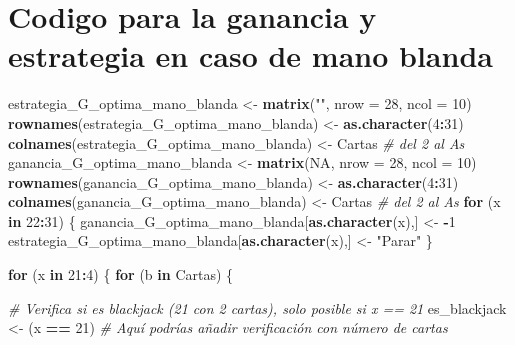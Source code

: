 \documentclass[12pt,a4paper,]{book}
\newenvironment{Shaded}{\begin{snugshade}}{\end{snugshade}}
\newcommand{\AttributeTok}[1]{\textcolor[rgb]{0.13,0.29,0.53}{#1}}
\newcommand{\CommentTok}[1]{\textcolor[rgb]{0.56,0.35,0.01}{\textit{#1}}}
\newcommand{\ConstantTok}[1]{\textcolor[rgb]{0.56,0.35,0.01}{#1}}
\newcommand{\ControlFlowTok}[1]{\textcolor[rgb]{0.13,0.29,0.53}{\textbf{#1}}}
\newcommand{\DecValTok}[1]{\textcolor[rgb]{0.00,0.00,0.81}{#1}}
\newcommand{\FunctionTok}[1]{\textcolor[rgb]{0.13,0.29,0.53}{\textbf{#1}}}
\newcommand{\NormalTok}[1]{#1}
\newcommand{\OtherTok}[1]{\textcolor[rgb]{0.56,0.35,0.01}{#1}}
\newcommand{\SpecialCharTok}[1]{\textcolor[rgb]{0.81,0.36,0.00}{\textbf{#1}}}
\newcommand{\StringTok}[1]{\textcolor[rgb]{0.31,0.60,0.02}{#1}}
\numberwithin{dummy}{section}
\theoremstyle{ocrenumbox}
\theoremstyle{blacknumex}
\theoremstyle{blacknumbox}
\theoremstyle{ocrenum}
\theoremstyle{ocrenum}
\begin{document}
\hypertarget{codigo-para-la-ganancia-y-estrategia-en-caso-de-mano-blanda}{%
\section{Codigo para la ganancia y estrategia en caso de mano
blanda}\label{codigo-para-la-ganancia-y-estrategia-en-caso-de-mano-blanda}}

\begin{Shaded}
\begin{Highlighting}[]
\NormalTok{estrategia\_G\_optima\_mano\_blanda }\OtherTok{\textless{}{-}} \FunctionTok{matrix}\NormalTok{(}\StringTok{""}\NormalTok{, }\AttributeTok{nrow =} \DecValTok{28}\NormalTok{, }\AttributeTok{ncol =} \DecValTok{10}\NormalTok{)}
\FunctionTok{rownames}\NormalTok{(estrategia\_G\_optima\_mano\_blanda) }\OtherTok{\textless{}{-}} \FunctionTok{as.character}\NormalTok{(}\DecValTok{4}\SpecialCharTok{:}\DecValTok{31}\NormalTok{)}
\FunctionTok{colnames}\NormalTok{(estrategia\_G\_optima\_mano\_blanda) }\OtherTok{\textless{}{-}}\NormalTok{ Cartas  }\CommentTok{\# del 2 al As}
\NormalTok{ganancia\_G\_optima\_mano\_blanda }\OtherTok{\textless{}{-}} \FunctionTok{matrix}\NormalTok{(}\ConstantTok{NA}\NormalTok{, }\AttributeTok{nrow =} \DecValTok{28}\NormalTok{, }\AttributeTok{ncol =} \DecValTok{10}\NormalTok{)}
\FunctionTok{rownames}\NormalTok{(ganancia\_G\_optima\_mano\_blanda) }\OtherTok{\textless{}{-}} \FunctionTok{as.character}\NormalTok{(}\DecValTok{4}\SpecialCharTok{:}\DecValTok{31}\NormalTok{)}
\FunctionTok{colnames}\NormalTok{(ganancia\_G\_optima\_mano\_blanda) }\OtherTok{\textless{}{-}}\NormalTok{ Cartas  }\CommentTok{\# del 2 al As}
\ControlFlowTok{for}\NormalTok{ (x }\ControlFlowTok{in} \DecValTok{22}\SpecialCharTok{:}\DecValTok{31}\NormalTok{) \{}
\NormalTok{  ganancia\_G\_optima\_mano\_blanda[}\FunctionTok{as.character}\NormalTok{(x),] }\OtherTok{\textless{}{-}} \SpecialCharTok{{-}}\DecValTok{1}
\NormalTok{  estrategia\_G\_optima\_mano\_blanda[}\FunctionTok{as.character}\NormalTok{(x),] }\OtherTok{\textless{}{-}} \StringTok{"Parar"}
\NormalTok{\}}

\ControlFlowTok{for}\NormalTok{ (x }\ControlFlowTok{in} \DecValTok{21}\SpecialCharTok{:}\DecValTok{4}\NormalTok{) \{}
  \ControlFlowTok{for}\NormalTok{ (b }\ControlFlowTok{in}\NormalTok{ Cartas) \{}
    
    \CommentTok{\# Verifica si es blackjack (21 con 2 cartas), solo posible si x == 21}
\NormalTok{    es\_blackjack }\OtherTok{\textless{}{-}}\NormalTok{ (x }\SpecialCharTok{==} \DecValTok{21}\NormalTok{)  }\CommentTok{\# Aquí podrías añadir verificación con número de cartas}
    

\end{Highlighting}
\end{Shaded}
\end{document}
